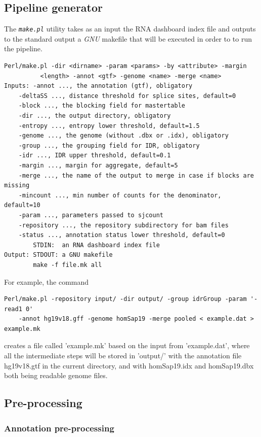 \documentclass{article}
\newcommand{\prog}[1]{{\tt\em #1}}
\begin{document}
\subsection{Pipeline generator}
The \prog{make.pl} utility takes as an input the RNA dashboard index file and outputs to the standard output a {\em GNU} makefile that 
will be executed in order to to run the pipeline.
\begin{verbatim} 
Perl/make.pl -dir <dirname> -param <params> -by <attribute> -margin 
          <length> -annot <gtf> -genome <name> -merge <name>
Inputs: -annot ..., the annotation (gtf), obligatory
	-deltaSS ..., distance threshold for splice sites, default=0
	-block ..., the blocking field for mastertable
	-dir ..., the output directory, obligatory
	-entropy ..., entropy lower threshold, default=1.5
	-genome ..., the genome (without .dbx or .idx), obligatory
	-group ..., the grouping field for IDR, obligatory
	-idr ..., IDR upper threshold, default=0.1
	-margin ..., margin for aggregate, default=5
	-merge ..., the name of the output to merge in case if blocks are missing
	-mincount ..., min number of counts for the denominator, default=10
	-param ..., parameters passed to sjcount
	-repository ..., the repository subdirectory for bam files
	-status ..., annotation status lower threshold, default=0
        STDIN:  an RNA dashboard index file 
Output: STDOUT: a GNU makefile
        make -f file.mk all
\end{verbatim} 

For example, the command
\begin{verbatim}
Perl/make.pl -repository input/ -dir output/ -group idrGroup -param '-read1 0' 
	-annot hg19v18.gff -genome homSap19 -merge pooled < example.dat > example.mk
\end{verbatim}
creates a file called 'example.mk' based on the input from 'example.dat', where all the intermediate steps will be stored in 'output/' 
with the annotation file hg19v18.gtf in the current directory, and with homSap19.idx and homSap19.dbx both being readable genome files.


\subsection{Pre-processing}

\subsubsection{Annotation pre-processing}
\label{sec::preprocessing}
\end{document}
